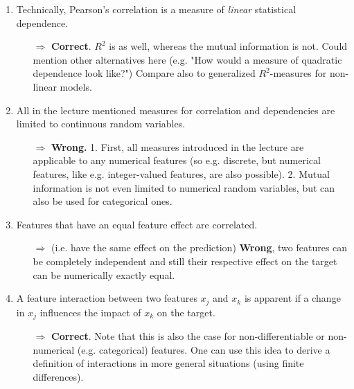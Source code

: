 \begin{enumerate}
        \item Technically, Pearson's correlation is a measure of \textit{linear} statistical dependence. 
        \begin{itemize}
        	\item[$\Rightarrow$] \textbf{Correct}. \(R^2\) is as well, whereas the mutual information is not. Could mention other alternatives here (e.g. "How would a measure of quadratic dependence look like?") Compare also to generalized \(R^2\)-measures for non-linear models.
        \end{itemize}
    	\item All in the lecture mentioned measures for correlation and dependencies are limited to continuous random variables.
    	\begin{itemize}
    		\item[$\Rightarrow$] \textbf{Wrong.} 1. First, all measures introduced in the lecture are applicable to any numerical features (so e.g. discrete, but numerical features, like e.g. integer-valued features, are also possible). 2. Mutual information is not even limited to numerical random variables, but can also be used for categorical ones.
    	\end{itemize}
        \item Features that have an equal feature effect are correlated. 
        \begin{itemize}
        	\item[$\Rightarrow$] (i.e. have the same effect on the prediction) \textbf{Wrong}, two features can be completely independent and still their respective effect on the target can be numerically exactly equal.
        \end{itemize}

    	\item A feature interaction between two features $x_j$ and $x_k$ is apparent if a change in $x_j$ influences the impact of $x_k$ on the target.
    	\begin{itemize}
    		\item[$\Rightarrow$] \textbf{Correct}. Note that this is also the case for non-differentiable or non-numerical (e.g. categorical) features. One can use this idea to derive a definition of interactions in more general situations (using finite differences).
    	\end{itemize}


\end{enumerate}
